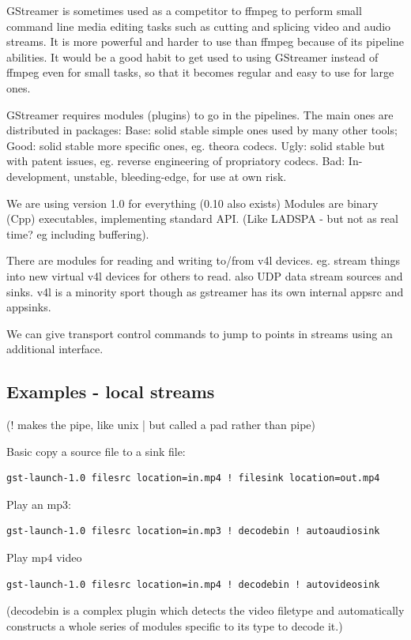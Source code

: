 \documentclass[oneside,english]{scrbook}
\begin{document}
GStreamer is sometimes used as a competitor to ffmpeg to perform small command line media editing tasks such as cutting and splicing video and audio streams. It is more powerful and harder to use than ffmpeg because of its pipeline abilities.  It would be a good habit to get used to using GStreamer instead of ffmpeg even for small tasks, so that it becomes regular and easy to use for large ones.

GStreamer requires modules (plugins) to go in the pipelines. The main ones are distributed in packages:
 Base: solid stable simple ones used by many other tools;
 Good: solid stable more specific ones, eg. theora codecs.
 Ugly: solid stable but with patent issues, eg. reverse engineering of propriatory codecs.
 Bad: In-development, unstable, bleeding-edge, for use at own risk.

We are using version 1.0 for everything (0.10 also exists) Modules
are binary (Cpp) executables, implementing standard API. (Like LADSPA
- but not as real time? eg including buffering).

There are modules for reading and writing to/from v4l devices. eg. stream things
into new virtual v4l devices for others to read. also UDP data stream
sources and sinks. v4l is a minority sport though as gstreamer has
its own internal appsrc and appsinks.

We can give transport control commands to jump to points in streams using an additional interface.

\subsection{Examples - local streams}

(\textquotedbl{}!\textquotedbl{} makes the pipe, like unix \textquotedbl{}|\textquotedbl{}
but called a \textquotedbl{}pad\textquotedbl{} rather than \textquotedbl{}pipe\textquotedbl{})

Basic copy a source file to a sink file: 

\begin{lstlisting}
gst-launch-1.0 filesrc location=in.mp4 ! filesink location=out.mp4
\end{lstlisting}

Play an mp3:

\begin{lstlisting}
gst-launch-1.0 filesrc location=in.mp3 ! decodebin ! autoaudiosink
\end{lstlisting}

Play mp4 video 
\begin{lstlisting}
gst-launch-1.0 filesrc location=in.mp4 ! decodebin ! autovideosink
\end{lstlisting}
(decodebin is a complex plugin which detects the video filetype and automatically constructs a whole series of modules specific to its type to decode it.)
\end{document}
